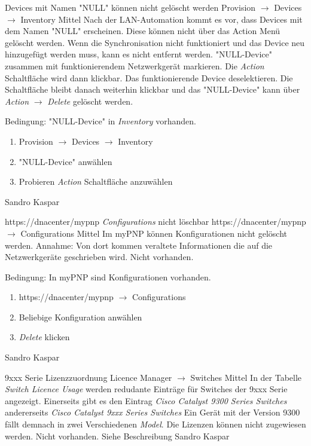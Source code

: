 \bugreport
{Devices mit Namen "NULL" können nicht gelöscht werden}
{Provision $\rightarrow$ Devices $\rightarrow$ Inventory}
{Mittel}
{Nach der LAN-Automation kommt es vor, dass Devices mit dem Namen "NULL" erscheinen. Diese können nicht über das Action Menü gelöscht werden.}
{Wenn die Synchronisation nicht funktioniert und das Device neu hinzugefügt werden muss, kann es nicht entfernt werden.}
{"NULL-Device" zusammen mit funktionierendem Netzwerkgerät markieren. Die \textit{Action} Schaltfläche wird dann klickbar. Das funktionierende Device deselektieren. Die Schaltfläche bleibt danach weiterhin klickbar und das "NULL-Device" kann über \textit{Action} $\rightarrow$ \textit{Delete} gelöscht werden.}
{
	Bedingung: "NULL-Device" in \textit{Inventory} vorhanden.
	\begin{enumerate}
		\item Provision $\rightarrow$ Devices $\rightarrow$ Inventory
		\item "NULL-Device" anwählen
		\item Probieren \textit{Action} Schaltfläche anzuwählen
	\end{enumerate}
}
{Sandro Kaspar}
{}

\bugreport
{https://dnacenter/mypnp \textit{Configurations} nicht löschbar}
{https://dnacenter/mypnp $\rightarrow$ Configurations}
{Mittel}
{Im myPNP können Konfigurationen nicht gelöscht werden.}
{Annahme: Von dort kommen veraltete Informationen die auf die Netzwerkgeräte geschrieben wird.}
{Nicht vorhanden.}
{
	Bedingung: In myPNP sind Konfigurationen vorhanden.
	\begin{enumerate}
		\item https://dnacenter/mypnp $\rightarrow$ Configurations
		\item Beliebige Konfiguration anwählen
		\item \textit{Delete} klicken
	\end{enumerate}
}
{Sandro Kaspar}
{}


\bugreport
{9xxx Serie Lizenzzuordnung}
{Licence Manager $\rightarrow$ Switches}
{Mittel}
{In der Tabelle \textit{Switch Licence Usage} werden redudante Einträge für Switches der 9xxx Serie angezeigt. Einerseits gibt es den Eintrag \textit{Cisco Catalyst 9300 Series Switches} andererseits \textit{Cisco Catalyst 9xxx Series Switches} Ein Gerät mit der Version 9300 fällt demnach in zwei Verschiedenen \textit{Model}.}
{Die Lizenzen können nicht zugewiesen werden.}
{Nicht vorhanden.}
{
Siehe Beschreibung
}
{Sandro Kaspar}
{}











